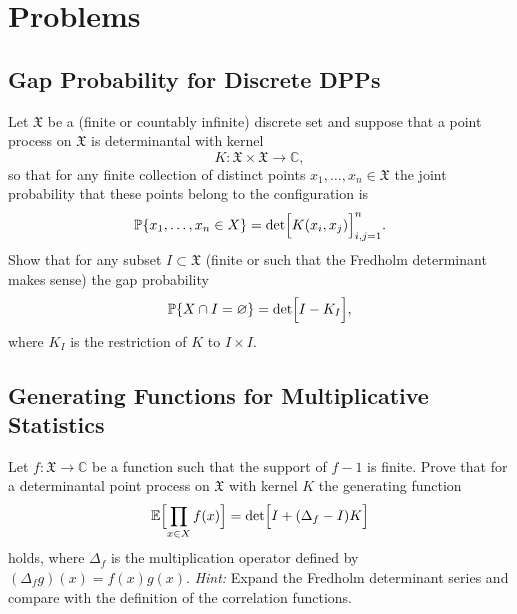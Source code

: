 \documentclass[letterpaper,11pt,oneside,reqno]{book}
\numberwithin{equation}{chapter}  %
\theoremstyle{definition}
\begin{document}
\section{Problems}


\subsection{Gap Probability for Discrete DPPs}
Let \(\mathfrak{X}\) be a (finite or countably infinite) discrete set and suppose that a point process on \(\mathfrak{X}\) is determinantal with kernel
\[
K : \mathfrak{X}\times\mathfrak{X}\to\mathbb{C},
\]
so that for any finite collection of distinct points \(x_1,\dots,x_n\in \mathfrak{X}\) the joint probability that these points belong to the configuration is
\[
\mathbb{P}\{x_1,\dots,x_n\in X\}=\det\Bigl[K(x_i,x_j)\Bigr]_{i,j=1}^n.
\]
Show that for any subset \(I\subset\mathfrak{X}\) (finite or such that the Fredholm determinant makes sense) the gap probability
\[
\mathbb{P}\{X\cap I=\varnothing\}=\det\Bigl[I-K_I\Bigr],
\]
where \(K_I\) is the restriction of \(K\) to \(I\times I\).


\subsection{Generating Functions for Multiplicative Statistics}
Let \(f:\mathfrak{X}\to\mathbb{C}\) be a function such that the support of \(f-1\) is finite. Prove that for a determinantal point process on \(\mathfrak{X}\) with kernel \(K\) the generating function
\[
\mathbb{E}\Bigl[\prod_{x\in X} f(x)\Bigr] = \det\Bigl[I+(\Delta_f-I)K\Bigr]
\]
holds, where \(\Delta_f\) is the multiplication operator defined by \((\Delta_f g)(x)=f(x)g(x)\).
\emph{Hint:} Expand the Fredholm determinant series and compare with the definition of the correlation functions.
\end{document}
